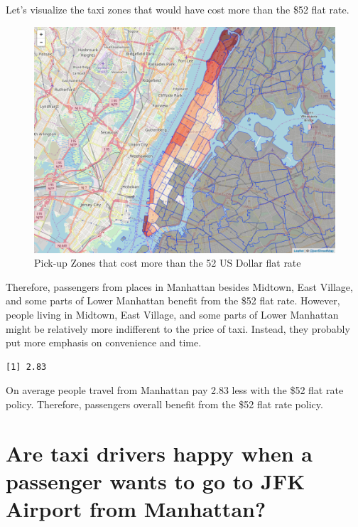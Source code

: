 \documentclass[12pt,twoside]{reedthesis}
\theoremstyle{definition}
\theoremstyle{definition}
\theoremstyle{definition}
\theoremstyle{remark}
\begin{document}
Let's visualize the taxi zones that would have cost more than the \$52
flat rate.
\begin{figure}

{\centering \includegraphics[width=5.84in]{figure/to_jfk_fare_above_vis} 

}

\caption{Pick-up Zones that cost more than the 52 US Dollar flat rate}\label{fig:to-jfk-fare-above-vis}
\end{figure}
Therefore, passengers from places in Manhattan besides Midtown, East
Village, and some parts of Lower Manhattan benefit from the \$52 flat
rate. However, people living in Midtown, East Village, and some parts of
Lower Manhattan might be relatively more indifferent to the price of
taxi. Instead, they probably put more emphasis on convenience and time.
\begin{verbatim}
[1] 2.83
\end{verbatim}
On average people travel from Manhattan pay 2.83 less with the \$52 flat
rate policy. Therefore, passengers overall benefit from the \$52 flat
rate policy.

\section{Are taxi drivers happy when a passenger wants to go to JFK
Airport from
Manhattan?}\label{are-taxi-drivers-happy-when-a-passenger-wants-to-go-to-jfk-airport-from-manhattan}
\end{document}
